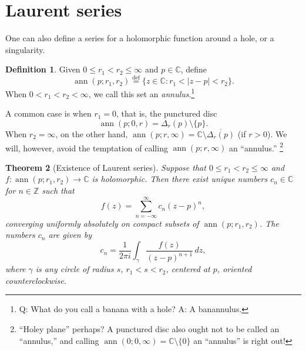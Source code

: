 \documentclass[12pt,openany]{book}
\newcommand{\glsadd}[2][]{}
\newcommand{\ann}{\operatorname{ann}}
\newcommand{\sabs}[1]{\lvert {#1} \rvert}
\newcommand{\C}{{\mathbb{C}}}
\newcommand{\Z}{{\mathbb{Z}}}
\newcommand{\myindex}[1]{#1\index{#1}}
\newcommand{\myquote}[1]{``#1''}
\theoremstyle{plain}
\newtheorem{thm}{Theorem}[section]
\theoremstyle{remark}
\theoremstyle{definition}
\newtheorem{defn}[thm]{Definition}
\theoremstyle{exercise}
\theoremstyle{example}
\begin{document}

\section{Laurent series}

One can also define a series for a holomorphic function around a hole, or a singularity.

\begin{defn}
Given $0 \leq r_1 < r_2 \leq \infty$ and $p \in \C$, define
\glsadd{not:annulus}%
\begin{equation*}
\ann(p;r_1,r_2)
\overset{\text{def}}{=}
\{ z \in \C : r_1 < \sabs{z - p} < r_2 \} .
\end{equation*}
When $0 < r_1 < r_2 < \infty$, we call this set an
\emph{\myindex{annulus}}.\footnote{%
Q\@: What do you call a banana with a hole?
A\@: A banannulus.}
\end{defn}

A common case is when $r_1 = 0$, that is,
the punctured disc
\begin{equation*}
\ann(p;0,r) = \Delta_r(p) \setminus \{ p \} .
\end{equation*}
When $r_2 = \infty$, on the other hand,
$\ann(p;r,\infty) = \C \setminus \overline{\Delta_{r}(p)}$ (if $r > 0$).  We will,
however, avoid the temptation of calling $\ann(p;r,\infty)$ an \myquote{annulus.}%
\footnote{\myquote{Holey plane} perhaps?  A punctured disc also ought not to be
called an \myquote{annulus,} and calling $\ann(0;0,\infty) = \C \setminus
\{ 0 \}$ an \myquote{annulus} is right out!}

\begin{thm}[Existence of Laurent series]
%
%
\label{thm:laurent}%
Suppose that $0 \leq r_1 < r_2 \leq \infty$ and
$f \colon \ann(p;r_1,r_2) \to \C$ is holomorphic.
Then there exist unique numbers $c_n \in \C$ for $n \in \Z$ such that
\glsadd{not:laurentser}%
\begin{equation*}
f(z) = \sum_{n=-\infty}^{\infty} c_n {(z-p)}^n ,
\end{equation*}
converging uniformly absolutely on compact subsets of
$\ann(p;r_1,r_2)$.  The numbers $c_n$ are given by
\begin{equation*}
c_n = 
\frac{1}{2\pi i}
\int_{\gamma}
\frac{f(z)}{{(z-p)}^{n+1}}
\,
dz  ,
\end{equation*}
where $\gamma$ is any circle of radius $s$, $r_1 < s < r_2$, centered at
$p$, oriented counterclockwise.
\end{thm}
\end{document}
